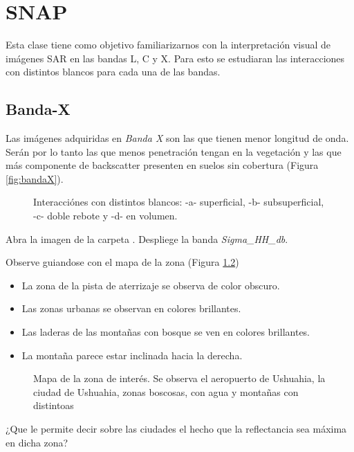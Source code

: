 \chapter{SNAP}

Esta clase tiene como objetivo familiarizarnos con la interpretación visual de imágenes SAR en las bandas L, C y X. Para esto se estudiaran las interacciones con distintos blancos para cada una de las bandas.

\section{Banda-X}

Las imágenes adquiridas en \emph{Banda X} son las que tienen menor longitud de onda. Serán por lo tanto las que menos penetración tengan en la vegetación y las que más componente de backscatter presenten en suelos sin cobertura (Figura \ref{fig:bandaX}).

\begin{figure}[h!]
    \centering
    \caption{Interacciónes con distintos blancos: -a- superficial, -b- subsuperficial, -c- doble rebote y -d- en volumen.}
    \label{bandaX}
\end{figure}

Abra la imagen  de la carpeta . Despliege la banda \emph{Sigma\_HH_db}.

Observe guiandose con el mapa de la zona (Figura \ref{fig:mapa})
\begin{itemize}
    \item La zona de la pista de aterrizaje se observa de color obscuro.
    \item Las zonas urbanas se observan en colores brillantes.
    \item Las laderas de las montañas con bosque se ven en colores brillantes.
    \item La montaña parece estar inclinada hacia la derecha.
\end{itemize}

\begin{figure}[h!]
    \centering
    \caption{Mapa de la zona de interés. Se observa el aeropuerto de Ushuahia, la ciudad de Ushuahia, zonas boscosas, con agua y montañas con distintoas}
    \label{fig:mapa}
\end{figure}

\begin{que}
    ¿Que le permite decir sobre las ciudades el hecho que la reflectancia sea máxima en dicha zona?
\end{que}

